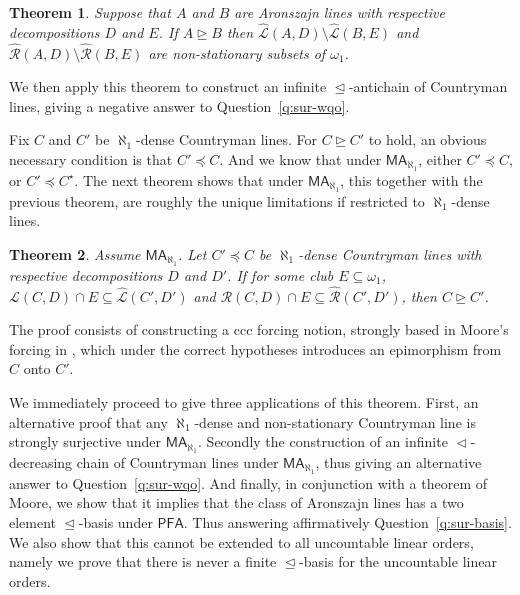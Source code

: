 \documentclass[10pt]{amsart}
\newtheorem{theorem}{Theorem}[section]
\theoremstyle{definition}
\theoremstyle{remark}
\newcommand{\seb}{\subseteq}
\newcommand{\setm}{\setminus}
\newcommand{\axiom}[1]{\mathsf{#1}}
\newcommand{\MA}{\axiom{MA}}
\newcommand{\PFA}{\axiom{PFA}}
\newcommand{\eleq}{\preceq}
\newcommand{\sle}{\vartriangleleft}
\newcommand{\sleq}{\trianglelefteq}
\newcommand{\sgeq}{\trianglerighteq}
\newcommand{\sur}{\twoheadrightarrow}
\renewcommand{\L}{\mathscr{L}}
\newcommand{\R}{\mathscr{R}}
\newcommand{\La}{\hat{\L}}
\newcommand{\Ra}{\hat{\R}}
\newcommand{\1}{\mathbbm{1}}
\begin{document}
\begin{theorem}
  Suppose that $A$ and $B$ are Aronszajn lines with respective
  decompositions $D$ and $E$. If $A \sgeq B$ then
  $\La(A,D) \setm \La(B,E)$ and $\Ra(A,D) \setm \Ra(B,E)$
  are non-stationary subsets of $\omega_{1}$.
\end{theorem}

We then apply this theorem to construct an infinite
$\sleq$-antichain of Countryman lines, giving a negative answer to Question~\ref{q:sur-wqo}.

Fix $C$ and $C'$ be $\aleph_{1}$-dense Countryman lines. For $C \sgeq C'$ to
hold, an obvious necessary condition is that $C' \eleq C$. And we
know that under $\MA_{\aleph_{1}}$, either $C' \eleq C$, or $C' \eleq C^{\star}$.
The next theorem shows that under $\MA_{\aleph_{1}}$, this together with
the previous theorem, are roughly the unique limitations if
restricted to $\aleph_{1}$-dense lines.

\begin{theorem}\label{thm:main2}
  Assume $\MA_{\aleph_{1}}$. Let $C' \eleq C$ be $\aleph_{1}$-dense
  Countryman lines with respective decompositions $D$ and $D'$.
  If for some club $E \seb \omega_{1}$,
  $\L(C,D) \cap E \seb \La(C',D')$ and $\R(C,D) \cap E \seb \Ra(C',D')$,
  then $C \sgeq C'$.
\end{theorem}

The proof consists of constructing a ccc forcing notion, strongly
based in Moore's forcing
in \cite{Moore2009}, which under the correct hypotheses
introduces an epimorphism from $C$ onto $C'$.

We immediately proceed to give three applications of this theorem.
First, an alternative
proof that any $\aleph_{1}$-dense and non-stationary Countryman line is
strongly surjective under $\MA_{\aleph_{1}}$. Secondly the construction of
an infinite $\sle$-decreasing chain of Countryman lines
under $\MA_{\aleph_{1}}$, thus giving
an alternative answer to Question~\ref{q:sur-wqo}. And finally, in conjunction
with a theorem of Moore, we show that it implies that the class
of Aronszajn lines has a two element $\sleq$-basis under $\PFA$.
Thus answering affirmatively Question~\ref{q:sur-basis}.
We also show that this cannot be extended to all
uncountable linear orders, namely we prove that there is never
a finite $\sleq$-basis for the uncountable linear orders.
\end{document}
